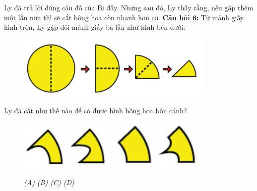 Ly đã trả lời đúng câu đố của Bi đấy. Nhưng sau đó, Ly thấy rằng, nếu gập thêm một lần nữa thì sẽ cắt bông hoa còn nhanh hơn cơ.
\vskip0.25cm
\textbf{Câu hỏi $\pmb{6}$:} Từ mảnh giấy hình tròn, Ly gập đôi mảnh giấy ba lần như hình bên dưới: 
\begin{figure}[H]
	\vspace*{-10pt}
	\captionsetup{labelformat=empty}
	\centering
	\captionsetup{justification=raggedleft}
	\includegraphics[width =0.85\textwidth]{cat-14}
\end{figure}	
Ly  đã cắt như thế nào để có được hình bông hoa bốn cánh?
\begin{figure}[H]
	\centering
	\captionsetup{labelformat=empty}
	\vspace*{-10pt}
	\captionsetup{justification=centering}
	\includegraphics[width =0.2\textwidth]{cat-15a}
	\hfill
	\includegraphics[width =0.2\textwidth]{cat-15b}
	\hfill
	\includegraphics[width =0.2\textwidth]{cat-15c}
	\hfill
	\includegraphics[width =0.2\textwidth]{cat-15d}	
	\caption{\small \it (A)\hspace*{40pt} (B)\hspace*{65pt} (C) \hspace*{40pt} (D)}
	\vspace*{-10pt}
\end{figure}
